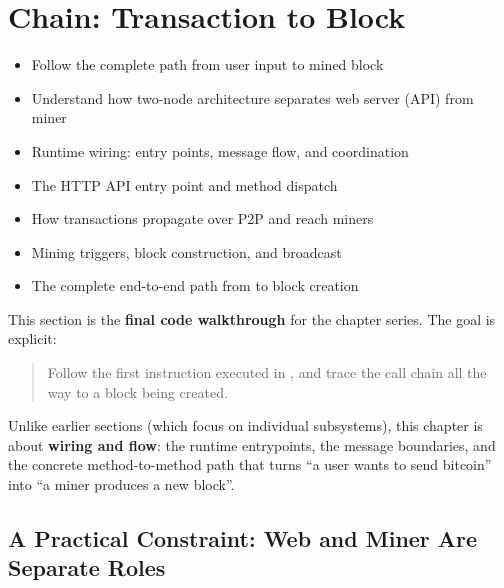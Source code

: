 \chapter{Chain: Transaction to Block}
\label{ch:tx-to-block}

\begin{learnbox}
\begin{itemize}
  \item Follow the complete path from user input to mined block
  \item Understand how two-node architecture separates web server (API) from miner
  \item Runtime wiring: entry points, message flow, and coordination
  \item The HTTP API entry point and method dispatch
  \item How transactions propagate over P2P and reach miners
  \item Mining triggers, block construction, and broadcast
  \item The complete end-to-end path from  to block creation
\end{itemize}
\end{learnbox}

This section is the \textbf{final code walkthrough} for the  chapter series. The goal is explicit:

\begin{quote}
Follow the first instruction executed in , and trace the call chain all the way to a block being created.
\end{quote}

Unlike earlier sections (which focus on individual subsystems), this chapter is about \textbf{wiring and flow}: the runtime entrypoints, the message boundaries, and the concrete method-to-method path that turns ``a user wants to send bitcoin'' into ``a miner produces a new block''.

\section{A Practical Constraint: Web and Miner Are Separate Roles}
\label{sec:ch09-9-separation}

